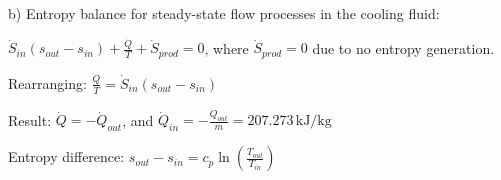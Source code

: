 b) Entropy balance for steady-state flow processes in the cooling fluid:  

\( \dot{S}_{in} \left( s_{out} - s_{in} \right) + \frac{\dot{Q}}{T} + \dot{S}_{prod} = 0 \), where \( \dot{S}_{prod} = 0 \) due to no entropy generation.  

Rearranging:  
\( \frac{\dot{Q}}{T} = \dot{S}_{in} \left( s_{out} - s_{in} \right) \)  

Result:  
\( \dot{Q} = -\dot{Q}_{out} \), and \( \dot{Q}_{in} = -\frac{\dot{Q}_{out}}{\dot{m}} = 207.273 \, \text{kJ/kg} \)  

Entropy difference:  
\( s_{out} - s_{in} = c_{p} \ln \left( \frac{T_{out}}{T_{in}} \right) \)